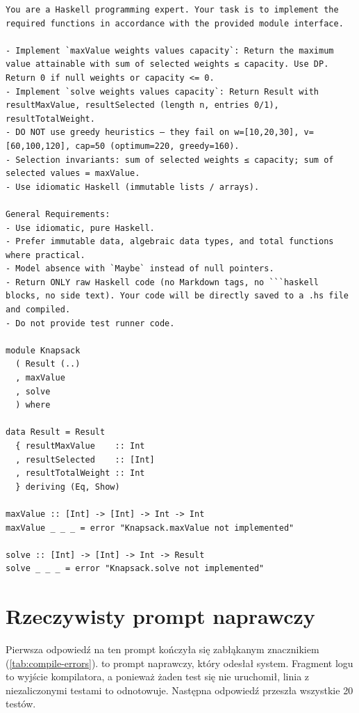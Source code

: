 \begin{lstlisting}[style=prompt,caption={Wygenerowany prompt początkowy, Haskell, zadanie 4.},label={lst:rendered}]
You are a Haskell programming expert. Your task is to implement the required functions in accordance with the provided module interface.

- Implement `maxValue weights values capacity`: Return the maximum value attainable with sum of selected weights ≤ capacity. Use DP. Return 0 if null weights or capacity <= 0.
- Implement `solve weights values capacity`: Return Result with resultMaxValue, resultSelected (length n, entries 0/1), resultTotalWeight.
- DO NOT use greedy heuristics — they fail on w=[10,20,30], v=[60,100,120], cap=50 (optimum=220, greedy=160).
- Selection invariants: sum of selected weights ≤ capacity; sum of selected values = maxValue.
- Use idiomatic Haskell (immutable lists / arrays).

General Requirements:
- Use idiomatic, pure Haskell.
- Prefer immutable data, algebraic data types, and total functions where practical.
- Model absence with `Maybe` instead of null pointers.
- Return ONLY raw Haskell code (no Markdown tags, no ```haskell blocks, no side text). Your code will be directly saved to a .hs file and compiled.
- Do not provide test runner code.

module Knapsack
  ( Result (..)
  , maxValue
  , solve
  ) where

data Result = Result
  { resultMaxValue    :: Int
  , resultSelected    :: [Int]
  , resultTotalWeight :: Int
  } deriving (Eq, Show)

maxValue :: [Int] -> [Int] -> Int -> Int
maxValue _ _ _ = error "Knapsack.maxValue not implemented"

solve :: [Int] -> [Int] -> Int -> Result
solve _ _ _ = error "Knapsack.solve not implemented"
\end{lstlisting}

\section{Rzeczywisty prompt naprawczy}

Pierwsza odpowiedź na ten prompt kończyła się zabłąkanym znacznikiem 
(\cref{tab:compile-errors}).  to prompt naprawczy, który odesłał system.
Fragment logu to wyjście kompilatora, a ponieważ żaden test się nie uruchomił, linia z niezaliczonymi
testami to odnotowuje. Następna odpowiedź przeszła wszystkie 20 testów.

